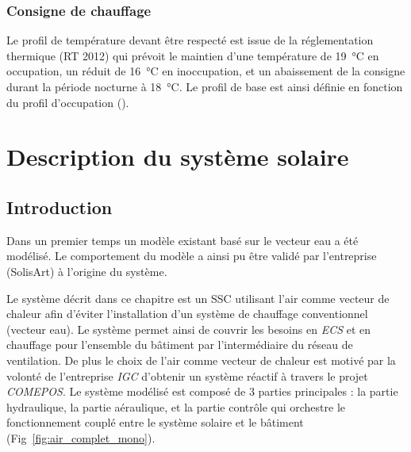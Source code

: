 

\subsubsection{Consigne de chauffage} %
\label{ssub:consigne_de_chauffage}
Le profil de température devant être respecté est issue de la réglementation thermique (RT
2012) qui prévoit le maintien d’une température de \SI{19}{\celsius} en occupation, un
réduit de \SI{16}{\celsius} en inoccupation, et un abaissement de la consigne durant la
période nocturne à \SI{18}{\celsius}. Le profil de base est ainsi définie en fonction du
profil d’occupation ().



\section{Description du système solaire} %
\label{sec:description_du_système_solaire}
\subsection{Introduction} %
\label{sub:introduction}

Dans un premier temps un modèle existant basé sur le vecteur eau a été modélisé.
Le comportement du modèle a ainsi pu être validé par l’entreprise (SolisArt) à
l’origine du système.

Le système décrit dans ce chapitre est un SSC utilisant l’air comme vecteur de chaleur
afin d’éviter l’installation d’un système de chauffage conventionnel (vecteur eau). Le
système permet ainsi de couvrir les besoins en \emph{ECS} et en chauffage pour l’ensemble du
bâtiment par l’intermédiaire du réseau de ventilation. De plus le choix de l’air comme
vecteur de chaleur est motivé par la volonté de l’entreprise \emph{IGC} d’obtenir un
système réactif à travers le projet \textit{COMEPOS}.
Le système modélisé est composé de 3 parties principales : la partie
hydraulique, la partie aéraulique, et la partie contrôle qui orchestre le fonctionnement
couplé entre le système solaire et le bâtiment (Fig~\ref{fig:air_complet_mono}).

